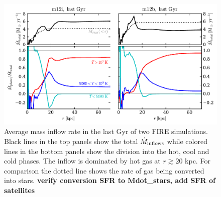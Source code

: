 \documentclass[fleqn,usenatbib]{mnras}
\newcommand{\Rvir}{R_{\rm vir}}
\begin{document}
\begin{figure}
    \centering
    \includegraphics{Mdot_normalized.pdf}
    \caption{
    Average mass inflow rate in the last Gyr of two FIRE simulations.
    Black lines in the top panels show the total $\dot{M}_{\rm inflows}$  while colored lines in the bottom panels show the division into the hot, cool and cold phases. 
    The inflow is dominated by hot gas at $r\gtrsim 20 $ kpc.
    For comparison the dotted line shows the rate of gas being converted into stars.
    \textbf{verify conversion SFR to Mdot\_stars, add SFR of satellites}
    }
    \label{f:Mdot}
\end{figure}
\end{document}
